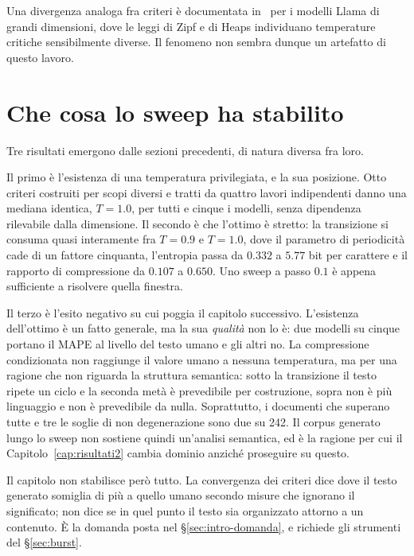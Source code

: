 Una divergenza analoga fra criteri è documentata
in~\cite{mikhaylovskiy2025zipf} per i modelli Llama di grandi dimensioni, dove
le leggi di Zipf e di Heaps individuano temperature critiche sensibilmente
diverse. Il fenomeno non sembra dunque un artefatto di questo lavoro.

\section{Che cosa lo sweep ha stabilito}
\label{sec:sintesi-cap4}

Tre risultati emergono dalle sezioni precedenti, di natura diversa fra loro.

Il primo è l'esistenza di una temperatura privilegiata, e la sua posizione. Otto
criteri costruiti per scopi diversi e tratti da quattro lavori indipendenti
danno una mediana identica, $T = 1.0$, per tutti e cinque i modelli, senza
dipendenza rilevabile dalla dimensione. Il secondo è che l'ottimo è stretto: la
transizione si consuma quasi interamente fra $T = 0.9$ e $T = 1.0$, dove il
parametro di periodicità cade di un fattore cinquanta, l'entropia passa da
$0.332$ a $5.77$ bit per carattere e il rapporto di compressione da $0.107$ a
$0.650$. Uno sweep a passo $0.1$ è appena sufficiente a risolvere quella
finestra.

Il terzo è l'esito negativo su cui poggia il capitolo successivo. L'esistenza
dell'ottimo è un fatto generale, ma la sua \emph{qualità} non lo è: due modelli
su cinque portano il MAPE al livello del testo umano e gli altri no. La
compressione condizionata non raggiunge il valore umano a nessuna temperatura,
ma per una ragione che non riguarda la struttura semantica: sotto la transizione
il testo ripete un ciclo e la seconda metà è prevedibile per costruzione, sopra
non è più linguaggio e non è prevedibile da nulla. Soprattutto, i documenti che
superano tutte e tre le soglie di non
degenerazione sono due su \num{242}. Il corpus generato lungo lo sweep non
sostiene quindi un'analisi semantica, ed è la ragione per cui il
Capitolo~\ref{cap:risultati2} cambia dominio anziché proseguire su questo.

Il capitolo non stabilisce però tutto. La convergenza dei criteri dice dove il
testo generato somiglia di più a quello umano secondo misure che ignorano il
significato; non dice se in quel punto il testo sia organizzato attorno a un
contenuto. È la domanda posta nel §\ref{sec:intro-domanda}, e richiede gli
strumenti del §\ref{sec:burst}.